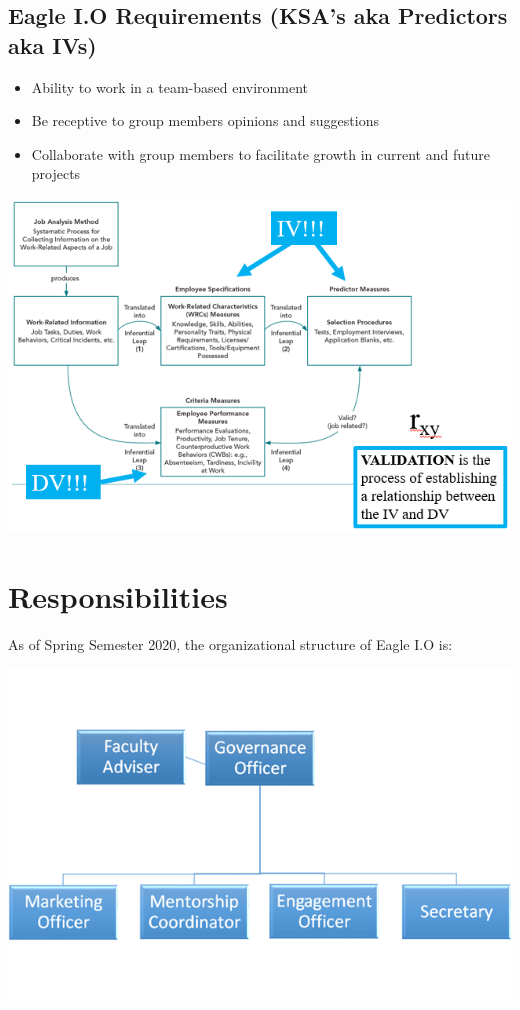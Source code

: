 \documentclass[
]{book}
\providecommand{\tightlist}{%
  \setlength{\itemsep}{0pt}\setlength{\parskip}{0pt}}
\begin{document}
\hypertarget{eagle-i.o-requirements-ksas-aka-predictors-aka-ivs}{%
\section{Eagle I.O Requirements (KSA's aka Predictors aka IVs)}\label{eagle-i.o-requirements-ksas-aka-predictors-aka-ivs}}

\begin{itemize}
\tightlist
\item
  Ability to work in a team-based environment
\item
  Be receptive to group members opinions and suggestions
\item
  Collaborate with group members to facilitate growth in current and future projects
\end{itemize}

\includegraphics{images/IVDV.PNG}

\hypertarget{responsibilities}{%
\chapter{Responsibilities}\label{responsibilities}}

As of Spring Semester 2020, the organizational structure of Eagle I.O is:

\includegraphics{images/orgchart.PNG}
\end{document}
